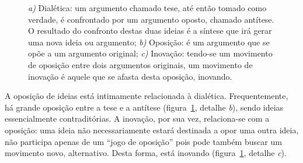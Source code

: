 \begin{figure}[ht!]
\begin{center}
\caption{\textit{a)} Dialética: um argumento chamado tese, até então
  tomado como verdade, é confrontado por um argumento oposto, chamado
  antítese. O resultado do confronto destas duas ideias é a síntese
  que irá gerar uma nova ideia ou argumento; \textit{b)} Oposição: é
  um argumento que se opõe a um argumento original; \textit{c)}
  Inovação: tendo-se um movimento de oposição entre dois argumentos
  originais, um movimento de inovação é aquele que se afasta desta
  oposição, inovando.}
\label{fig:conceitos}

\fonteminha
\end{center}
\end{figure}

A oposição de ideias está intimamente relacionada à
dialética. Frequentemente, há grande oposição entre a tese e a
antítese (figura~\ref{fig:conceitos}, detalhe \textit{b}), sendo
ideias essencialmente contraditórias. A inovação, por sua vez,
relaciona-se com a oposição: uma ideia não necessariamente estará
destinada a opor uma outra ideia, não participa apenas de um ``jogo de
oposição'' pois pode também buscar um movimento novo,
alternativo. Desta forma, está inovando (figura~\ref{fig:conceitos},
detalhe \textit{c}).

